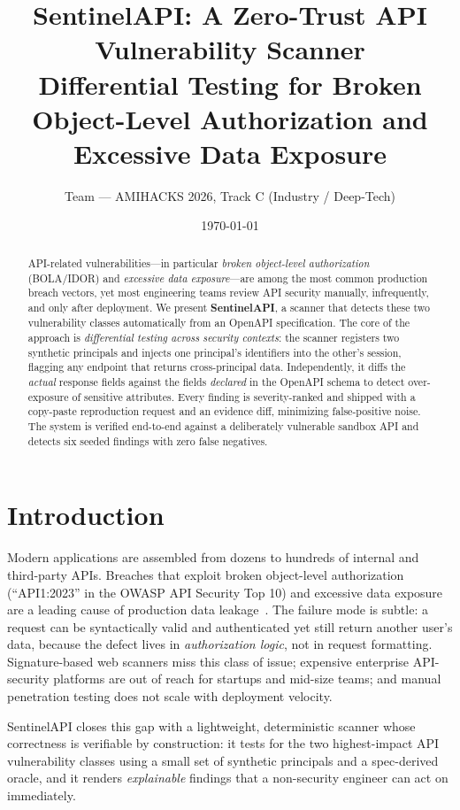 \documentclass[11pt]{article}
\title{\bfseries SentinelAPI: A Zero-Trust API Vulnerability Scanner\\[2mm]
       \large Differential Testing for Broken Object-Level Authorization and Excessive Data Exposure}
\author{Team --- AMIHACKS 2026, Track C (Industry / Deep-Tech)}
\date{\today}
\begin{document}
\maketitle

\begin{abstract}
API-related vulnerabilities---in particular \emph{broken object-level authorization}
(BOLA/IDOR) and \emph{excessive data exposure}---are among the most common production
breach vectors, yet most engineering teams review API security manually, infrequently,
and only after deployment. We present \textbf{SentinelAPI}, a scanner that detects these
two vulnerability classes automatically from an OpenAPI specification. The core of the
approach is \emph{differential testing across security contexts}: the scanner registers two
synthetic principals and injects one principal's identifiers into the other's session,
flagging any endpoint that returns cross-principal data. Independently, it diffs the
\emph{actual} response fields against the fields \emph{declared} in the OpenAPI schema to
detect over-exposure of sensitive attributes. Every finding is severity-ranked and shipped
with a copy-paste reproduction request and an evidence diff, minimizing false-positive
noise. The system is verified end-to-end against a deliberately vulnerable sandbox API and
detects six seeded findings with zero false negatives.
\end{abstract}

\section{Introduction}
Modern applications are assembled from dozens to hundreds of internal and third-party APIs.
Breaches that exploit broken object-level authorization (``API1:2023'' in the OWASP API
Security Top 10) and excessive data exposure are a leading cause of production data
leakage~\cite{owasp}. The failure mode is subtle: a request can be syntactically valid and
authenticated yet still return another user's data, because the defect lives in
\emph{authorization logic}, not in request formatting. Signature-based web scanners miss
this class of issue; expensive enterprise API-security platforms are out of reach for
startups and mid-size teams; and manual penetration testing does not scale with deployment
velocity.

SentinelAPI closes this gap with a lightweight, deterministic scanner whose correctness is
verifiable by construction: it tests for the two highest-impact API vulnerability classes
using a small set of synthetic principals and a spec-derived oracle, and it renders
\emph{explainable} findings that a non-security engineer can act on immediately.
\end{document}
